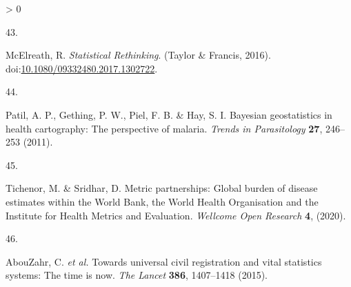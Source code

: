 \documentclass[
]{article}
\newlength{\cslhangindent}
\newlength{\csllabelwidth}
\newenvironment{CSLReferences}[2] %
 {%
  \setlength{\parindent}{0pt}
  \ifodd #1 \everypar{\setlength{\hangindent}{\cslhangindent}}\ignorespaces\fi
  \ifnum #2 > 0
  \setlength{\parskip}{#2\baselineskip}
  \fi
 }%
 {}
\newcommand{\CSLLeftMargin}[1]{\parbox[t]{\csllabelwidth}{#1}}
\newcommand{\CSLRightInline}[1]{\parbox[t]{\linewidth - \csllabelwidth}{#1}\break}
\begin{document}
\begin{CSLReferences}{0}{0}
\leavevmode\hypertarget{ref-McElreath2016}{}%
\CSLLeftMargin{43. }
\CSLRightInline{McElreath, R. \emph{{Statistical Rethinking}}. (Taylor \& Francis, 2016). doi:\href{https://doi.org/10.1080/09332480.2017.1302722}{10.1080/09332480.2017.1302722}.}

\leavevmode\hypertarget{ref-Patil2011}{}%
\CSLLeftMargin{44. }
\CSLRightInline{Patil, A. P., Gething, P. W., Piel, F. B. \& Hay, S. I. {Bayesian geostatistics in health cartography: The perspective of malaria}. \emph{Trends in Parasitology} \textbf{27}, 246--253 (2011).}

\leavevmode\hypertarget{ref-Tichenor2020}{}%
\CSLLeftMargin{45. }
\CSLRightInline{Tichenor, M. \& Sridhar, D. {Metric partnerships: Global burden of disease estimates within the World Bank, the World Health Organisation and the Institute for Health Metrics and Evaluation}. \emph{Wellcome Open Research} \textbf{4}, (2020).}

\leavevmode\hypertarget{ref-AbouZahr2015}{}%
\CSLLeftMargin{46. }
\CSLRightInline{AbouZahr, C. \emph{et al.} {Towards universal civil registration and vital statistics systems: The time is now}. \emph{The Lancet} \textbf{386}, 1407--1418 (2015).}

\end{CSLReferences}

\newpage
\end{document}
